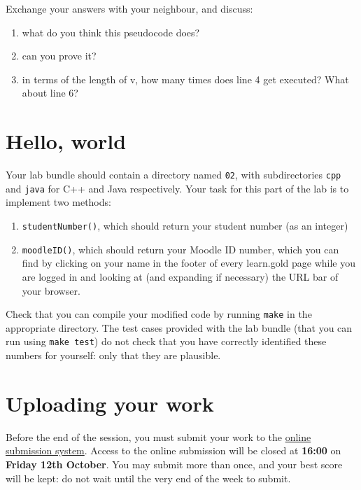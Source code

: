 \documentclass[11pt]{article}
\begin{document}
\noindent Exchange your answers with your neighbour, and discuss:
\begin{enumerate}
\item what do you think this pseudocode does?
\item can you prove it?
\item in terms of the length of v, how many times does line 4 get
executed?  What about line 6?
\end{enumerate}
\section{Hello, world}
\label{sec:orgf25097a}
Your lab bundle should contain a directory named \texttt{02}, with
subdirectories \texttt{cpp} and \texttt{java} for C++ and Java respectively.  Your
task for this part of the lab is to implement two methods:

\begin{enumerate}
\item \texttt{studentNumber()}, which should return your student number (as an
integer)
\item \texttt{moodleID()}, which should return your Moodle ID number, which
you can find by clicking on your name in the footer of every
learn.gold page while you are logged in and looking at (and
expanding if necessary) the URL bar of your browser.
\end{enumerate}

Check that you can compile your modified code by running \texttt{make} in
the appropriate directory.  The test cases provided with the lab
bundle (that you can run using \texttt{make test}) do not check that you
have correctly identified these numbers for yourself: only that they
are plausible.
\section{Uploading your work}
\label{sec:org790cb0a}
Before the end of the session, you must submit your work to the
\href{https://learn.gold.ac.uk/mod/lti/view.php?id=605172}{online submission system}.  Access to the online submission will be
closed at \textbf{16:00} on \textbf{Friday 12th October}.  You may submit more
than once, and your best score will be kept: do not wait until the
very end of the week to submit.
\end{document}
